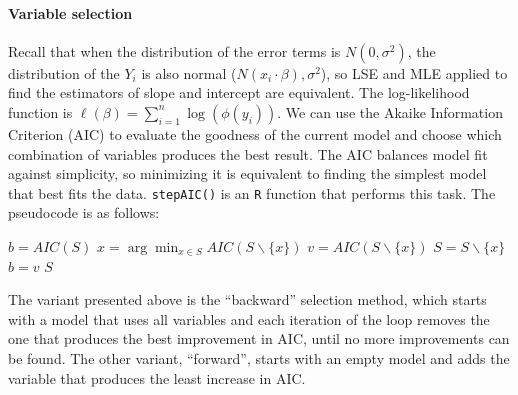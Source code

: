 \paragraph{Variable selection}
Recall that when the distribution of the error terms is $N(0, \sigma^2)$, the distribution of the $Y_i$ is also normal ($N(x_i \cdot \beta), \sigma^2$), so LSE and MLE applied to find the estimators of slope and intercept are equivalent. The log-likelihood function is $\ell(\beta) = \sum_{i=1}^n \log(\phi(y_i))$. We can use the Akaike Information Criterion (AIC) to evaluate the goodness of the current model and choose which combination of variables produces the best result. The AIC balances model fit against simplicity, so minimizing it is equivalent to finding the simplest model that best fits the data. \texttt{stepAIC()} is an \texttt{R} function that performs this task. The pseudocode is as follows:
\begin{algorithm}
    \begin{algorithmic}
            \State $b = AIC(S)$
                \State $x = \arg\min_{x \in S} AIC(S \backslash \{x\})$
                \State $v = AIC(S \backslash \{x\})$
                    \State $S = S \backslash \{x\}$
                    \State $b = v$
                \EndIf
            \EndWhile
            \State\Return $S$
        \EndFunction
    \end{algorithmic}
\end{algorithm}
The variant presented above is the ``backward'' selection method, which starts with a model that uses all variables and each iteration of the loop removes the one that produces the best improvement in AIC, until no more improvements can be found. The other variant, ``forward'', starts with an empty model and adds the variable that produces the least increase in AIC.

